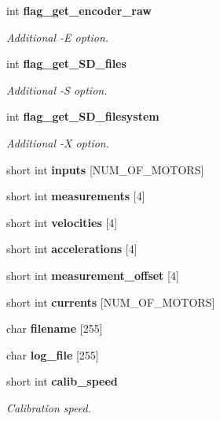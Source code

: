 \begin{DoxyCompactItemize}
\mbox{\label{structglobal__args_a164f166bb4586e4027b8daf4cb01ff6d}} 
int \textbf{ flag\+\_\+get\+\_\+encoder\+\_\+raw}
\begin{DoxyCompactList}\small\item\em Additional -\/E option. \end{DoxyCompactList}\item 
\mbox{\label{structglobal__args_a719195fe3d00020f463f848ecd4c6aee}} 
int \textbf{ flag\+\_\+get\+\_\+\+S\+D\+\_\+files}
\begin{DoxyCompactList}\small\item\em Additional -\/S option. \end{DoxyCompactList}\item 
\mbox{\label{structglobal__args_a6b1f9674336ce1ade6b5edc07ffae33d}} 
int \textbf{ flag\+\_\+get\+\_\+\+S\+D\+\_\+filesystem}
\begin{DoxyCompactList}\small\item\em Additional -\/X option. \end{DoxyCompactList}\item 
\mbox{\label{structglobal__args_a5c5d83977377b63e3671b52680be11aa}} 
short int {\bfseries inputs} [N\+U\+M\+\_\+\+O\+F\+\_\+\+M\+O\+T\+O\+RS]
\item 
\mbox{\label{structglobal__args_a4c65d251aa919a9ae56d11639a748ccf}} 
short int {\bfseries measurements} [4]
\item 
\mbox{\label{structglobal__args_aa064f75f1bb48d252dabea993cd8c393}} 
short int {\bfseries velocities} [4]
\item 
\mbox{\label{structglobal__args_a6fe131122f89735be8fb030f8333e8c8}} 
short int {\bfseries accelerations} [4]
\item 
\mbox{\label{structglobal__args_a8e63e8b1dcf1ee3b6429110e26a7ef3d}} 
short int {\bfseries measurement\+\_\+offset} [4]
\item 
\mbox{\label{structglobal__args_aff0783d0bf2ae80eadc0c85a84db1549}} 
short int {\bfseries currents} [N\+U\+M\+\_\+\+O\+F\+\_\+\+M\+O\+T\+O\+RS]
\item 
\mbox{\label{structglobal__args_a522de19291f23fb0be3eb346cc1957e9}} 
char {\bfseries filename} [255]
\item 
\mbox{\label{structglobal__args_ad0345d4821606480fcb0e28327340660}} 
char {\bfseries log\+\_\+file} [255]
\item 
\mbox{\label{structglobal__args_a74aee2224894f2773538b376bcdd3a65}} 
short int \textbf{ calib\+\_\+speed}
\begin{DoxyCompactList}\small\item\em Calibration speed. \end{DoxyCompactList}\item 

\end{DoxyCompactItemize}
